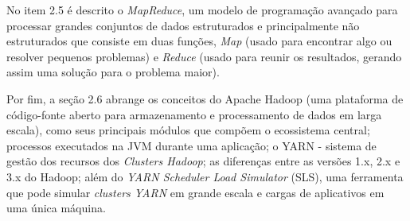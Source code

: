 No item 2.5 é descrito o \emph{MapReduce}, um modelo de programação avançado para processar grandes conjuntos de dados estruturados e principalmente não estruturados que consiste em duas funções, \emph{Map} (usado para encontrar algo ou resolver pequenos problemas) e \emph{Reduce} (usado para reunir os resultados, gerando assim uma solução para o problema maior).

Por fim, a seção 2.6 abrange os conceitos do Apache Hadoop (uma plataforma de código-fonte aberto para armazenamento e processamento de dados em larga escala), como seus principais módulos que compõem o ecossistema central; processos executados na JVM durante uma aplicação; o YARN - sistema de gestão dos recursos dos \emph{Clusters Hadoop}; as diferenças entre as versões 1.x, 2.x e 3.x do Hadoop; além do \emph{YARN Scheduler Load Simulator} (SLS), uma ferramenta que pode simular \emph{clusters YARN} em grande escala e cargas de aplicativos em uma única máquina.

